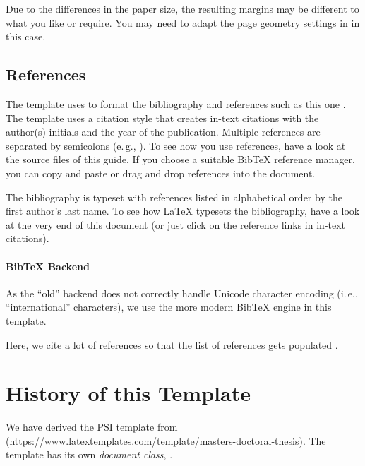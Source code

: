 Due to the differences in the paper size, the resulting margins may be different to what you like or require. You may need to adapt the page geometry settings in  in this case.

\subsection{References}

The template uses  to format the bibliography and references such as this one \cite{murdoch_steven_j._chip_2010}. The template uses a citation style that creates in-text citations with the author(s) initials and the year of the publication. Multiple references are separated by semicolons (e.\,g., \cite{solat_security_2017, bond_chip_2014}). To see how you use references, have a look at the source files of this guide. If you choose a suitable BibTeX reference manager, you can copy and paste or drag and drop references into the document.

The bibliography is typeset with references listed in alphabetical order by the first author's last name. To see how LaTeX typesets the bibliography, have a look at the very end of this document (or just click on the reference links in in-text citations).

\paragraph{BibTeX Backend}

As the ``old''  backend does not correctly handle Unicode character encoding (i.\,e., ``international'' characters), we use the more modern  BibTeX engine in this template.

Here, we cite a lot of references so that the list of references gets populated \cite{murdoch_steven_j._chip_2010,anderson_ross_emv:_2014,kou_weidong_secure_2003,solat_security_2017,bond_chip_2014,ortiz_s._is_2006,haselsteiner_security_2006,galloway_visa_2019,zhou_nshield_2014,lalehTaxonomyFraudsFraud2009,ferradiWhenOrganizedCrime2016,Yang10,Kopsell06,VilaGM03,Herrmann12-ipv6prefix,Herrmann14-diss,HBF:2013,Herrmann11-NordSec,AcarEEJND14,Herrmann09,WangG13,Raymond00,Hintz02,Herrmann14-encdns,Goodson12-privacy,WendolskyHF07,chaum81,BertholdFK00,Dingledine04,rfc5246,LoesingMD10,FuchsHF13}.


\section{History of this Template}
We have derived the PSI template from  (\url{https://www.latextemplates.com/template/masters-doctoral-thesis}). The template has its own \emph{document class}, .

